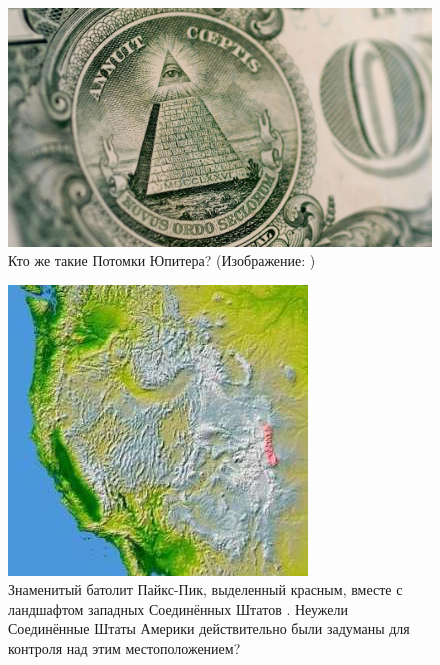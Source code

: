 \documentclass[10pt,twocolumn,letterpaper]{article}
\begin{document}
\begin{figure}[t]
\begin{center}
\includegraphics[width=1\linewidth]{illuminati.jpg}
\end{center}
   \caption{Кто же такие Потомки Юпитера? (Изображение: \cite{35})}
\label{fig:10}
\label{fig:onecol}
\end{figure}

\begin{figure}[t]
\begin{center}
   \includegraphics[width=1\linewidth]{pike.jpg}
\end{center}
   \caption{Знаменитый батолит Пайкс-Пик, выделенный красным, вместе с ландшафтом западных Соединённых Штатов \cite{36}. Неужели Соединённые Штаты Америки действительно были задуманы для контроля над этим местоположением?}
\label{fig:11}
\label{fig:onecol}
\end{figure}
\end{document}

